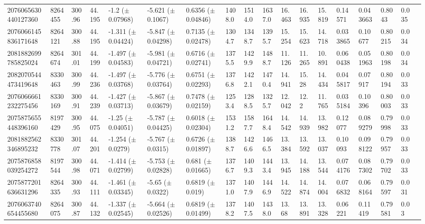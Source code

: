 \begin{sidewaystable}[htbp]
{\begin{tabular}{llllllllllllllllll}
        2076065630440127360 & 8264455 & 300.96 & 44.195 & -1.2 ($\pm$ 0.07968) & -5.621 ($\pm$ 0.1067) & 0.6356 ($\pm$ 0.04846) & 1408.0 & 1514.0 & 1637.0 & 16.463 & 16.935 & 15.819 & 0.14571 & 0.043663 & 0.8043 & 0.035 & \\
        2076066145836171648 & 8264121 & 300.88 & 44.195 & -1.311 ($\pm$ 0.04424) & -5.847 ($\pm$ 0.04298) & 0.7135 ($\pm$ 0.02478) & 1304.7 & 1348.7 & 1395.7 & 15.254 & 15.623 & 14.718 & 0.033865 & 0.10677 & 0.80215 & 0.034 & \\
        2081882699785825024 & 8264674 & 301.01 & 44.199 & -1.497 ($\pm$ 0.04583) & -5.981 ($\pm$ 0.04721) & 0.6716 ($\pm$ 0.02741) & 1375.5 & 1429.9 & 1488.7 & 11.126 & 11.265 & 10.891 & 0.060438 & 0.051963 & 0.80198 & 0.034 & \\
        2082070544473419648 & 8330463 & 300.99 & 44.236 & -1.497 ($\pm$ 0.03768) & -5.776 ($\pm$ 0.03764) & 0.6751 ($\pm$ 0.02293) & 1376.8 & 1422.1 & 1470.4 & 14.941 & 15.28 & 14.434 & 0.045817 & 0.07917 & 0.80194 & 0.033 & \\
        2076066661232275456 & 8330169 & 300.91 & 44.239 & -1.427 ($\pm$ 0.03713) & -5.867 ($\pm$ 0.03679) & 0.7478 ($\pm$ 0.02159) & 1253.4 & 1288.5 & 1325.7 & 12.042 & 12.2 & 11.765 & 0.035184 & 0.10396 & 0.80003 & 0.033 & \\
        2075875655448396160 & 8197429 & 300.95 & 44.075 & -1.25 ($\pm$ 0.04051) & -5.787 ($\pm$ 0.04425) & 0.6018 ($\pm$ 0.02304) & 1531.2 & 1587.7 & 1648.4 & 14.542 & 14.939 & 13.982 & 0.12077 & 0.089279 & 0.79998 & 0.033 & \\
        2081882562346895232 & 8330778 & 301.07 & 44.201 & -1.254 ($\pm$ 0.0279) & -5.767 ($\pm$ 0.0315) & 0.6726 ($\pm$ 0.01897) & 1388.7 & 1426.6 & 1466.5 & 13.384 & 13.592 & 13.037 & 0.10093 & 0.098122 & 0.79957 & 0.033 & \\
        2075876858039254272 & 8197544 & 300.98 & 44.071 & -1.414 ($\pm$ 0.02799) & -5.753 ($\pm$ 0.02828) & 0.681 ($\pm$ 0.01665) & 1376.7 & 1409.3 & 1443.4 & 13.945 & 14.188 & 13.544 & 0.074176 & 0.087302 & 0.79702 & 0.033 & \\
        2075877201636631296 & 8264335 & 300.93 & 44.111 & -1.461 ($\pm$ 0.03345) & -5.65 ($\pm$ 0.0322) & 0.6819 ($\pm$ 0.019) & 1371.0 & 1407.9 & 1446.9 & 14.522 & 14.874 & 14.004 & 0.076832 & 0.068164 & 0.79597 & 0.031 & \\
        2076063740654455680 & 8264075 & 300.87 & 44.132 & -1.337 ($\pm$ 0.02545) & -5.664 ($\pm$ 0.02526) & 0.6819 ($\pm$ 0.01499) & 1378.2 & 1407.5 & 1438.0 & 13.68 & 13.891 & 13.328 & 0.06221 & 0.11419 & 0.79581 & 0.03 & \\

\end{tabular}}
\end{sidewaystable}
